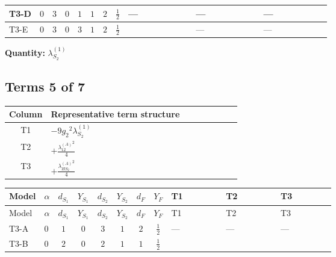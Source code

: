 \documentclass[8pt]{article}
\begin{document}
\begin{landscape}
\begin{longtable}{@{}llcccccc >{\raggedright\arraybackslash}p{0.21\linewidth} >{\raggedright\arraybackslash}p{0.21\linewidth} >{\raggedright\arraybackslash}p{0.21\linewidth}@{}}
\midrule
T3-D & $0$ & $3$ & $0$ & $1$ & $1$ & $2$ & $\frac{1}{2}$ & --- & --- & --- \\
\midrule
T3-E & $0$ & $3$ & $0$ & $3$ & $1$ & $2$ & $\frac{1}{2}$ & \scriptsize\adjustbox{max width=\linewidth}{$\begin{gathered} +26 {\lambda_{S_2}^{(A)}}^2\end{gathered}$} & --- & --- \\
\midrule
\bottomrule
\end{longtable}
\clearpage
\noindent\textbf{Quantity: }$\lambda_{S_2}^{(1)}$\par\smallskip
\subsection*{Terms 5 of 7}
\begin{center}
\begin{tabular}{@{}c >{\raggedright\arraybackslash}p{0.82\linewidth}@{}}
\toprule
Column & Representative term structure \\
\midrule
T1 & \(\displaystyle -9 {g_2}^2 {\lambda_{S_2}^{(1)}}\) \\
\midrule
T2 & \(\displaystyle +\frac{{\lambda_{12}^{(A)}}^2}{4}\) \\
\midrule
T3 & \(\displaystyle +\frac{{\lambda_{HS_2}^{(A)}}^2}{4}\) \\
\midrule
\bottomrule
\end{tabular}
\end{center}
\smallskip
\tiny
\begin{longtable}{@{}llcccccc >{\raggedright\arraybackslash}p{0.21\linewidth} >{\raggedright\arraybackslash}p{0.21\linewidth} >{\raggedright\arraybackslash}p{0.21\linewidth}@{}}
\toprule
Model & $\alpha$ & $d_{S_1}$ & $Y_{S_1}$ & $d_{S_2}$ & $Y_{S_2}$ & $d_F$ & $Y_F$ & T1 & T2 & T3 \\
\midrule
\endfirsthead
\toprule
Model & $\alpha$ & $d_{S_1}$ & $Y_{S_1}$ & $d_{S_2}$ & $Y_{S_2}$ & $d_F$ & $Y_F$ & T1 & T2 & T3 \\
\midrule
\endhead
T3-A & $0$ & $1$ & $0$ & $3$ & $1$ & $2$ & $\frac{1}{2}$ & --- & --- & --- \\
\midrule
T3-B & $0$ & $2$ & $0$ & $2$ & $1$ & $1$ & $\frac{1}{2}$ & \scriptsize\adjustbox{max width=\linewidth}{$\begin{gathered} -9 {g_2}^2 {\lambda_{S_2}^{(1)}}\end{gathered}$} & \scriptsize\adjustbox{max width=\linewidth}{$\begin{gathered} +\frac{{\lambda_{12}^{(A)}}^2}{4}\end{gathered}$} & \scriptsize\adjustbox{max width=\linewidth}{$\begin{gathered} +\frac{{\lambda_{HS_2}^{(A)}}^2}{4}\end{gathered}$} \\

\end{longtable}
\end{landscape}
\end{document}
